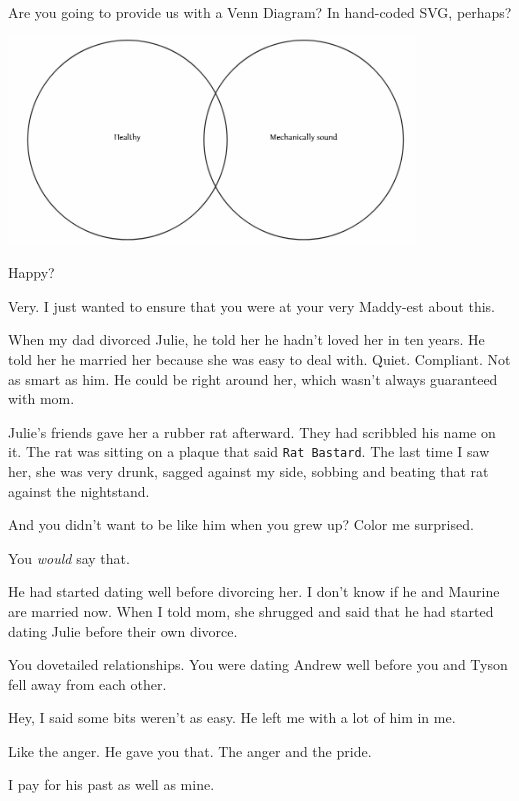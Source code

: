 \begin{leftcolumn}
\begin{ally}
Are you going to provide us with a Venn Diagram? In hand-coded SVG, perhaps?
\end{ally}

\noindent\includegraphics[width=4.25in]{assets/static/healthy-sound.png}

Happy?

\begin{ally}
Very. I just wanted to ensure that you were at your very Maddy-est about this.
\end{ally}
When my dad divorced Julie, he told her he hadn't loved her in ten years. He told her he married her because she was easy to deal with. Quiet. Compliant. Not as smart as him. He could be right around her, which wasn't always guaranteed with mom.

Julie's friends gave her a rubber rat afterward. They had scribbled his name on it. The rat was sitting on a plaque that said \texttt{Rat\ Bastard}. The last time I saw her, she was very drunk, sagged against my side, sobbing and beating that rat against the nightstand.

\begin{ally}
And you didn't want to be like him when you grew up? Color me surprised.
\end{ally}
You \emph{would} say that.

He had started dating well before divorcing her. I don't know if he and Maurine are married now. When I told mom, she shrugged and said that he had started dating Julie before their own divorce.

\begin{ally}
You dovetailed relationships. You were dating Andrew well before you and Tyson fell away from each other.
\end{ally}
Hey, I said some bits weren't as easy. He left me with a lot of him in me.

\begin{ally}
Like the anger. He gave you that. The anger and the pride.
\end{ally}
I pay for his past as well as mine.


\end{leftcolumn}
